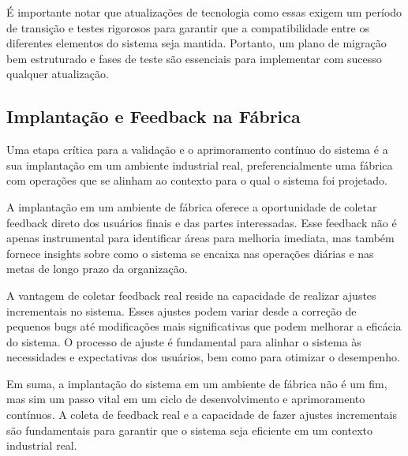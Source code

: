 É importante notar que atualizações de tecnologia como essas exigem um período de transição e testes rigorosos para garantir que a compatibilidade entre os diferentes elementos do sistema seja mantida. Portanto, um plano de migração bem estruturado e fases de teste são essenciais para implementar com sucesso qualquer atualização.


\subsection{Implantação e Feedback na Fábrica}

Uma etapa crítica para a validação e o aprimoramento contínuo do sistema é a sua implantação em um ambiente industrial real, preferencialmente uma fábrica com operações que se alinham ao contexto para o qual o sistema foi projetado.

A implantação em um ambiente de fábrica oferece a oportunidade de coletar feedback direto dos usuários finais e das partes interessadas. Esse feedback não é apenas instrumental para identificar áreas para melhoria imediata, mas também fornece insights sobre como o sistema se encaixa nas operações diárias e nas metas de longo prazo da organização.

A vantagem de coletar feedback real reside na capacidade de realizar ajustes incrementais no sistema. Esses ajustes podem variar desde a correção de pequenos bugs até modificações mais significativas que podem melhorar a eficácia do sistema. O processo de ajuste é fundamental para alinhar o sistema às necessidades e expectativas dos usuários, bem como para otimizar o desempenho.


Em suma, a implantação do sistema em um ambiente de fábrica não é um fim, mas sim um passo vital em um ciclo de desenvolvimento e aprimoramento contínuos. A coleta de feedback real e a capacidade de fazer ajustes incrementais são fundamentais para garantir que o sistema seja eficiente em um contexto industrial real.










